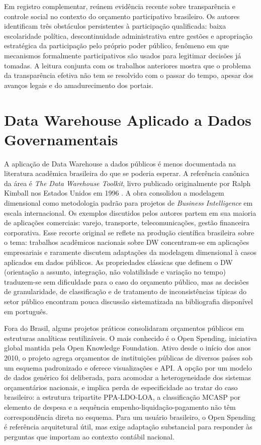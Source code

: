 Em registro complementar,  reúnem evidência recente sobre transparência e controle social no contexto do orçamento participativo brasileiro. Os autores identificam três obstáculos persistentes à participação qualificada: baixa escolaridade política, descontinuidade administrativa entre gestões e apropriação estratégica da participação pelo próprio poder público, fenômeno em que mecanismos formalmente participativos são usados para legitimar decisões já tomadas. A leitura conjunta com os trabalhos anteriores mostra que o problema da transparência efetiva não tem se resolvido com o passar do tempo, apesar dos avanços legais e do amadurecimento dos portais.

\section{Data Warehouse Aplicado a Dados Governamentais}

A aplicação de Data Warehouse a dados públicos é menos documentada na literatura acadêmica brasileira do que se poderia esperar. A referência canônica da área é \textit{The Data Warehouse Toolkit}, livro publicado originalmente por Ralph Kimball nos Estados Unidos em 1996 \cite{kimball2013data}. A obra consolidou a modelagem dimensional como metodologia padrão para projetos de \textit{Business Intelligence} em escala internacional. Os exemplos discutidos pelos autores partem em sua maioria de aplicações comerciais: varejo, transporte, telecomunicações, gestão financeira corporativa. Esse recorte original se reflete na produção científica brasileira sobre o tema: trabalhos acadêmicos nacionais sobre DW concentram-se em aplicações empresariais e raramente discutem adaptações da modelagem dimensional à casos aplicados em dados públicos. As propriedades clássicas que definem o DW (orientação a assunto, integração, não volatilidade e variação no tempo) traduzem-se sem dificuldade para o caso do orçamento público, mas as decisões de granularidade, de classificação e de tratamento de inconsistências típicas do setor público encontram pouca discussão sistematizada na bibliografia disponível em português.

Fora do Brasil, alguns projetos práticos consolidaram orçamentos públicos em estruturas analíticas reutilizáveis. O mais conhecido é o Open Spending, iniciativa global mantida pela Open Knowledge Foundation. Ativo desde o início dos anos 2010, o projeto agrega orçamentos de instituições públicas de diversos países sob um esquema padronizado e oferece visualizações e API. A opção por um modelo de dados genérico foi deliberada, para acomodar a heterogeneidade dos sistemas orçamentários nacionais, e implica perda de especificidade ao tratar do caso brasileiro: a estrutura tripartite PPA-LDO-LOA, a classificação MCASP por elemento de despesa e a sequência empenho-liquidação-pagamento não têm correspondência direta no esquema. Para um usuário brasileiro, o Open Spending é referência arquitetural útil, mas exige adaptação substancial para responder às perguntas que importam ao contexto contábil nacional.

